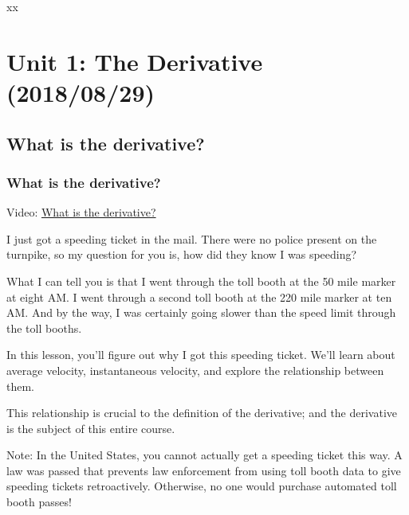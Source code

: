 \documentclass[pdftex, brazil, 12pt, twoside]{article}
\begin{document}
xx




\newpage
\section{Unit 1: The Derivative (2018/08/29)}
\label{u1}


\subsection{What is the derivative?}
\label{u1-what}

\subsubsection{What is the derivative?}
\label{u1-what-what}

Video: \href{https://www.youtube.com/watch?v=MCxsXQKNd-U}{What is the derivative?}

I just got a speeding ticket in the mail.
There were no police present on the turnpike, so my question for you is, how did
they know I was speeding?

What I can tell you is that I went
through the toll booth at the 50 mile marker at eight AM.
I went through a second toll booth at the 220 mile marker
at ten AM.
And by the way, I was certainly going slower than the speed
limit through the toll booths.

In this lesson, you'll figure out
why I got this speeding ticket.
We'll learn about average velocity,
instantaneous velocity, and explore
the relationship between them.

This relationship is crucial to the definition
of the derivative; and the derivative
is the subject of this entire course.

Note: In the United States, you cannot actually get a speeding ticket this way.
A law was passed that prevents law enforcement from using toll booth data to give
speeding tickets retroactively. Otherwise, no one would purchase automated
toll booth passes!
\end{document}
